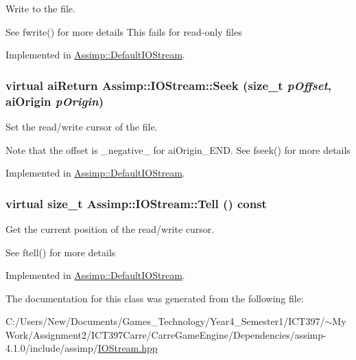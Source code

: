 Write to the file. 

See fwrite() for more details This fails for read-only files 

Implemented in \hyperlink{class_assimp_1_1_default_i_o_stream_05de25f9ac717801fbd0aad06499657a}{Assimp::DefaultIOStream}.\hypertarget{class_assimp_1_1_i_o_stream_5ed0dddf418ab08cf3fc21f3f3032220}{
\subsubsection[Seek]{\setlength{\rightskip}{0pt plus 5cm}virtual {\bf aiReturn} Assimp::IOStream::Seek (size\_\-t {\em pOffset}, \/  {\bf aiOrigin} {\em pOrigin})}}
\label{class_assimp_1_1_i_o_stream_5ed0dddf418ab08cf3fc21f3f3032220}


Set the read/write cursor of the file. 

Note that the offset is \_\-negative\_\- for aiOrigin\_\-END. See fseek() for more details 

Implemented in \hyperlink{class_assimp_1_1_default_i_o_stream_1f4b8aa9afaaa2b300d6cee6165a6a6d}{Assimp::DefaultIOStream}.\hypertarget{class_assimp_1_1_i_o_stream_316ac6cd16b5a493d1313f792c806194}{
\subsubsection[Tell]{\setlength{\rightskip}{0pt plus 5cm}virtual size\_\-t Assimp::IOStream::Tell () const}}
\label{class_assimp_1_1_i_o_stream_316ac6cd16b5a493d1313f792c806194}


Get the current position of the read/write cursor. 

See ftell() for more details 

Implemented in \hyperlink{class_assimp_1_1_default_i_o_stream_561a6cce1927a760e2d04fab87df38f9}{Assimp::DefaultIOStream}.

The documentation for this class was generated from the following file:\begin{CompactItemize}
\item 
C:/Users/New/Documents/Games\_\-Technology/Year4\_\-Semester1/ICT397/$\sim$My Work/Assignment2/ICT397Carre/CarreGameEngine/Dependencies/assimp-4.1.0/include/assimp/\hyperlink{_i_o_stream_8hpp}{IOStream.hpp}\end{CompactItemize}
